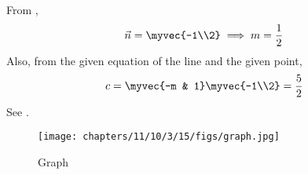 From ,
\begin{align}
	\vec{n} = \myvec{-1\\2} \implies m = \frac{1}{2}
\end{align}
Also, from the given equation of the line and the given point, 
\begin{align}
	c = \myvec{-m & 1}\myvec{-1\\2} = 
\frac{5}{2}  
\end{align}
 See .
\begin{figure}[H]
 \centering
\texttt{[image: chapters/11/10/3/15/figs/graph.jpg]}
 \caption{Graph}
 \label{fig:pic}
\end{figure}

